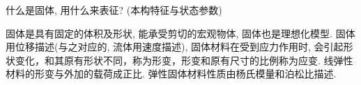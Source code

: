 \begin{problem}[04]
什么是固体, 用什么来表征? (本构特征与状态参数)
\end{problem}
\begin{solution}
固体是具有固定的体积及形状, 能承受剪切的宏观物体, 固体也是理想化模型. 固体用位移描述(与之对应的, 流体用速度描述), 固体材料在受到应力作用时, 会引起形状变化，和其原有形状不同，称为形变，形变和原有尺寸的比例称为应变. 线弹性材料的形变与外加的载荷成正比. 弹性固体材料性质由杨氏模量和泊松比描述.
\end{solution}
